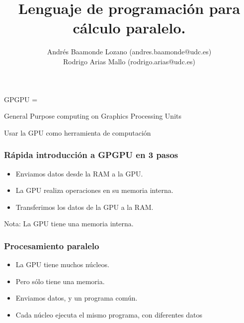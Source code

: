 \documentclass{beamer}
\title{Lenguaje de programación para cálculo paralelo.}
\author{Andrés Baamonde Lozano (andres.baamonde@udc.es)\\
	Rodrigo Arias Mallo (rodrigo.arias@udc.es)}
\begin{document}




\begin{frame}

GPGPU =

General	Purpose computing on Graphics Processing Units

\pause

Usar la GPU como herramienta de computación

\end{frame}



\begin{frame}
\frametitle{Rápida introducción a GPGPU en 3 pasos}

\begin{itemize}
\item Enviamos datos desde la RAM a la GPU.
\item La GPU realiza operaciones en su memoria interna.
\item Transferimos los datos de la GPU a la RAM.
\end{itemize}

Nota: La GPU tiene una memoria interna.

\end{frame}



\begin{frame}
\frametitle{Procesamiento paralelo}

\begin{itemize}
\item La GPU tiene muchos núcleos.
\item Pero sólo tiene una memoria.
\item Enviamos datos, y un programa común.
\item Cada núcleo ejecuta el mismo programa, con diferentes datos
\end{itemize}

\end{frame}
\end{document}
